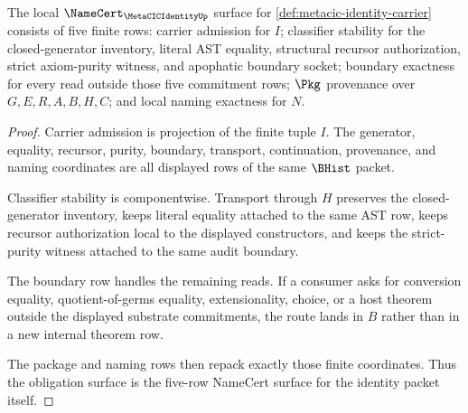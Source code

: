 \begin{theorem}
\label{thm:metacic-identity-namecert-obligations}
The local $\NameCert_{\MetaCICIdentityUp}$ surface for \autoref{def:metacic-identity-carrier} consists of five finite rows: carrier admission for $I$; classifier stability for the closed-generator inventory, literal AST equality, structural recursor authorization, strict axiom-purity witness, and apophatic boundary socket; boundary exactness for every read outside those five commitment rows; $\Pkg$ provenance over $G,E,R,A,B,H,C$; and local naming exactness for $N$.
\end{theorem}
\begin{proof}
Carrier admission is projection of the finite tuple $I$. The generator, equality, recursor, purity, boundary, transport, continuation, provenance, and naming coordinates are all displayed rows of the same $\BHist$ packet.

Classifier stability is componentwise. Transport through $H$ preserves the closed-generator inventory, keeps literal equality attached to the same AST row, keeps recursor authorization local to the displayed constructors, and keeps the strict-purity witness attached to the same audit boundary.

The boundary row handles the remaining reads. If a consumer asks for conversion equality, quotient-of-germs equality, extensionality, choice, or a host theorem outside the displayed substrate commitments, the route lands in $B$ rather than in a new internal theorem row.

The package and naming rows then repack exactly those finite coordinates. Thus the obligation surface is the five-row NameCert surface for the identity packet itself.
\end{proof}

